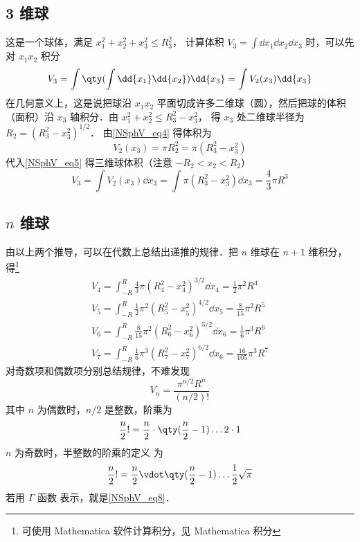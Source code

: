 \subsection{ 3 维球}
这是一个球体，满足 $x_1^2 + x_2^2 + x_3^2 \leqslant R_3^2$， 计算体积 $V_3 = \int \dd{x_1}\dd{x_2} \dd{x_3}$ 时，可以先对 $x_1 x_2$ 积分
\begin{equation}\label{NSphV_eq5}
V_3 = \int \qty(\int \dd{x_1} \dd{x_2}) \dd{x_3} = \int V_2(x_3) \dd{x_3}
\end{equation}
在几何意义上，这是说把球沿 $x_1 x_2$ 平面切成许多二维球（圆），然后把球的体积（面积）沿 $x_3$ 轴积分．由 $x_1^2 + x_2^2 \leqslant R_3^2 - x_3^2$， 得 $x_3$ 处二维球半径为 $R_2 = (R_3^2 - x_3^2)^{1/2}$． 由\autoref{NSphV_eq4} 得体积为
\begin{equation}\label{NSphV_eq6}
V_2 (x_3) = \pi R_2^2 = \pi (R_3^2 - x_3^2)
\end{equation}
代入\autoref{NSphV_eq5} 得三维球体积（注意 $-R_2 < x_2 < R_2$）
\begin{equation}\label{NSphV_eq7}
V_3 = \int V_2(x_3) \dd{x_3} = \int \pi (R_3^2 - x_3^2)\dd{x_3}  = \frac43 \pi R^3
\end{equation}
\subsection{ $n$ 维球}
由以上两个推导，可以在代数上总结出递推的规律．把 $n$ 维球在 $n+1$ 维积分，得\footnote{可使用  Mathematica 软件计算积分，见 Mathematica 积分}%
\begin{gather}
V_4 = \int_{-R}^R \frac43 \pi (R_4^2 - x_4^2)^{3/2} \dd{x_4}  = \frac12 \pi^2 R^4\\
V_5 = \int_{-R}^R \frac12 \pi^2 (R_5^2 - x_5^2)^{4/2} \dd{x_5}  = \frac{8}{15} \pi^2 R^5\\
V_6 = \int_{-R}^R \frac{8}{15} \pi ^2 (R_6^2 - x_6^2)^{5/2} \dd{x_6} = \frac16 \pi^3 R^6\\
V_7 = \int_{-R}^R \frac16 \pi^3 (R_7^2 - x_7^2)^{6/2} \dd{x_6} = \frac{16}{105} \pi^3 R^7
\end{gather}
对奇数项和偶数项分别总结规律，不难发现
\begin{equation}
V_n = \frac{\pi^{n/2}{R^n}}{(n/2)!}
\end{equation}
其中 $n$ 为偶数时，$n/2$ 是整数，阶乘为
\begin{equation}
\frac{n}{2}! = \frac{n}{2}\cdot \qty(\frac{n}{2}-1)\dots 2\cdot 1
\end{equation}
$n$ 为奇数时，半整数的阶乘的定义 为
\begin{equation}
\frac{n}{2}! = \frac{n}{2} \vdot \qty(\frac{n}{2}-1) \dots \frac12 \sqrt{\pi}
\end{equation}
若用 $\Gamma $ 函数 表示，就是\autoref{NSphV_eq8}．
